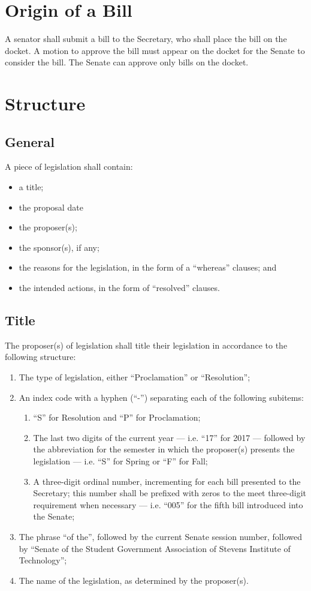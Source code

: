 \documentclass[12pt]{scrreprt}
\begin{document}
\section{Origin of a Bill}
A senator shall submit a bill to the Secretary, who shall place the bill on the docket. A motion to approve the bill must appear on the docket for the Senate to consider the bill. The Senate can approve only bills on the docket.

\section{Structure} \label{sec:bill_content}
\subsection{General}
A piece of legislation shall contain:
\begin{itemize}
    \item a title;
    \item the proposal date
    \item the proposer(s);
    \item the sponsor(s), if any;
    \item the reasons for the legislation, in the form of a “whereas” clauses; and
    \item the intended actions, in the form of “resolved” clauses.
\end{itemize}
    

\subsection{Title}
The proposer(s) of legislation shall title their legislation in accordance to the following
structure:
\begin{enumerate}
    \item The type of legislation, either “Proclamation” or “Resolution”;
    \item An index code with a hyphen (“-”) separating each of the following subitems:
    \begin{enumerate}
        \item “S” for Resolution and “P” for Proclamation;
        \item The last two digits of the current year — i.e. “17” for 2017 — followed by the abbreviation for the semester in which the proposer(s) presents the legislation — i.e. “S” for Spring or “F” for Fall;
        \item A three-digit ordinal number, incrementing for each bill presented to the Secretary; this number shall be prefixed with zeros to the meet three-digit requirement when necessary — i.e. “005” for the fifth bill introduced into the Senate;
    \end{enumerate}
    \item The phrase “of the”, followed by the current Senate session number, followed by “Senate of the Student Government Association of Stevens Institute of Technology”;
    \item The name of the legislation, as determined by the proposer(s).
\end{enumerate}
\end{document}
